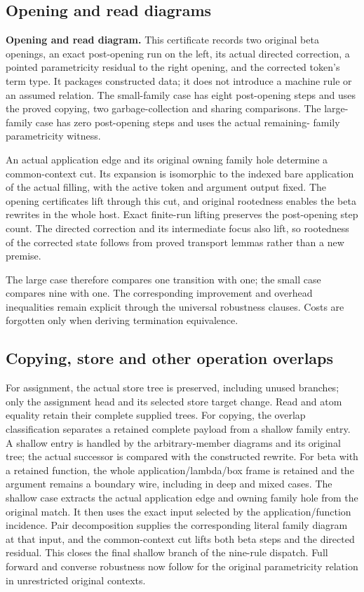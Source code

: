 \subsection{Opening and read diagrams}
\textbf{Opening and read diagram.} This certificate records two original beta
openings, an exact post-opening run on the left, its actual directed correction,
a pointed parametricity residual to the right opening, and the corrected token's
term type. It packages constructed data; it does not introduce a machine rule
or an assumed relation. The small-family case has eight post-opening steps and
uses the proved copying, two garbage-collection and sharing comparisons. The
large-family case has zero post-opening steps and uses the actual remaining-
family parametricity witness.

An actual application edge and its original owning family hole determine a
common-context cut. Its expansion is isomorphic to the indexed bare application
of the actual filling, with the active token and argument output fixed. The
opening certificates lift through this cut, and original rootedness enables
the beta rewrites in the whole host. Exact finite-run lifting preserves the
post-opening step count. The directed correction and its intermediate focus
also lift, so rootedness of the corrected state follows from proved transport
lemmas rather than a new premise.

The large case therefore compares one transition with one; the small case
compares nine with one. The corresponding improvement and overhead inequalities
remain explicit through the universal robustness clauses. Costs are forgotten
only when deriving termination equivalence.

\subsection{Copying, store and other operation overlaps}
For assignment, the actual store tree is preserved, including unused branches;
only the assignment head and its selected store target change. Read and atom
equality retain their complete supplied trees. For copying, the overlap
classification separates a retained complete payload from a shallow family
entry. A shallow entry is handled by the arbitrary-member diagrams and its
original tree; the actual successor is compared with the constructed rewrite.
For beta with a retained function, the whole application/lambda/box frame is
retained and the argument remains a boundary wire, including in deep and mixed
cases. The shallow case extracts the actual application edge and owning family
hole from the original match. It then uses the exact input selected by the
application/function incidence. Pair decomposition supplies the corresponding
literal family diagram at that input, and the common-context cut lifts both
beta steps and the directed residual. This closes the final shallow branch of
the nine-rule dispatch. Full forward and converse robustness now follow for
the original parametricity relation in unrestricted original contexts.

